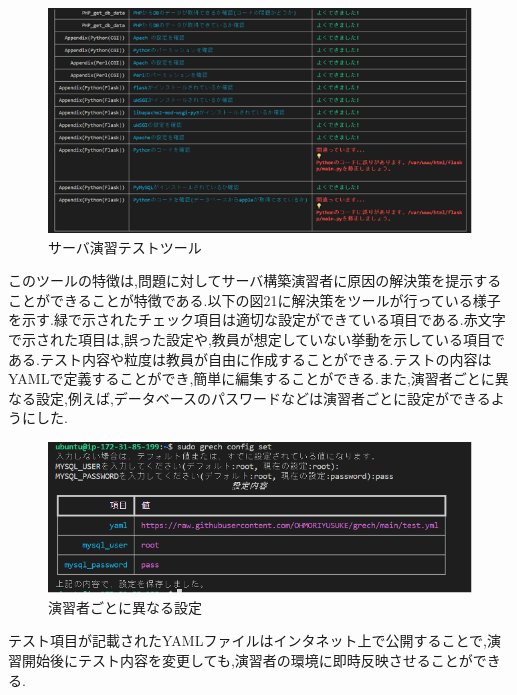 \documentclass[11pt, a4paper]{jreport}
\begin{document}
\begin{figure}[H]
\begin{center}
\includegraphics[width=140mm]{./img/grech.png}
\caption{サーバ演習テストツール}
\label{fig:append_grech}
\end{center}
\end{figure}


このツールの特徴は,問題に対してサーバ構築演習者に原因の解決策を提示することができることが特徴である.以下の図21に解決策をツールが行っている様子を示す.緑で示されたチェック項目は適切な設定ができている項目である.赤文字で示された項目は,誤った設定や,教員が想定していない挙動を示している項目である.テスト内容や粒度は教員が自由に作成することができる.テストの内容はYAMLで定義することができ,簡単に編集することができる.また,演習者ごとに異なる設定,例えば,データベースのパスワードなどは演習者ごとに設定ができるようにした.

\begin{figure}[H]
\begin{center}
\includegraphics[width=140mm]{./img/grech_config.png}
\caption{演習者ごとに異なる設定}
\label{fig:append_grech_config}
\end{center}
\end{figure}

テスト項目が記載されたYAMLファイルはインタネット上で公開することで,演習開始後にテスト内容を変更しても,演習者の環境に即時反映させることができる.
\end{document}
